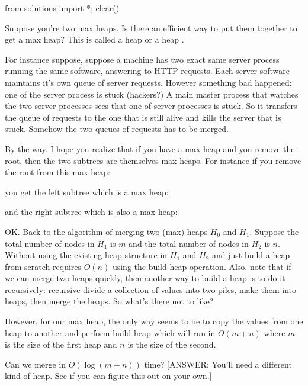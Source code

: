 \begin{python0}
from solutions import *; clear()
\end{python0}

Suppose you're two max heaps.
Is there an efficient way to put them together to get a max heap?
This is called a heap  or a heap .

For instance suppose, suppose a machine has
two exact same server process running the same software,
answering to HTTP requests.
Each server software maintains it's own queue of server requests.
However something bad happened: one of the server process is stuck
(hackers?)
A main master process that watches the two server processes
sees that one of server processes is stuck.
So it transfers the queue of requests to the one that is still alive
and kills the server that is stuck.
Somehow the two queues of requests has to be merged.

By the way.
I hope you realize that if you have a max heap and you remove the
root, then the two subtrees are themselves max heaps.
For instance if you remove the root from this max heap:



you get the left subtree which is a max heap:



and the right subtree which is also a max heap:



OK.
Back to the algorithm of merging two (max) heaps $H_0$ and $H_1$.
Suppose the total number of nodes in $H_1$ is $m$
and the total number of nodes in $H_2$ is $n$.
Without using the existing heap structure in $H_1$ and $H_2$
and just build a heap from scratch requires $O(n)$ using the build-heap
operation.
Also, note that if we can merge two heaps quickly,
then another way to build a heap is to do it recursively:
recursive divide a collection of values into two piles,
make them into heaps, then merge the heaps.
So what's there not to like?

However, for our max heap, the only way seems to be to copy the
values from one heap to another and perform build-heap
which will run in $O(m + n)$
where $m$ is the size of the first heap and $n$ is the size of the second.


\begin{ex}
Can we merge in $O(\log (m + n))$ time?
[ANSWER: You'll need a different kind of heap.
See if you can figure this out on your own.]
\end{ex}



